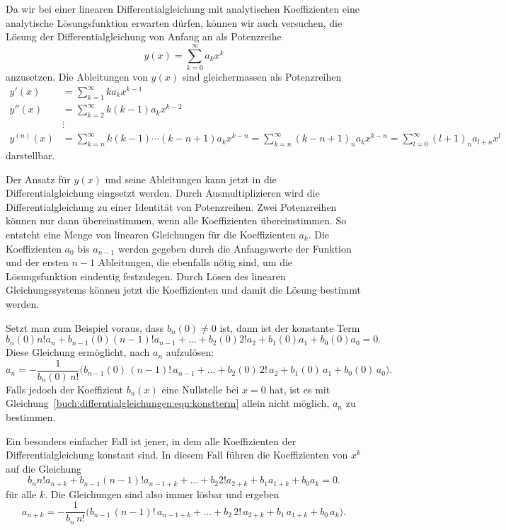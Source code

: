 Da wir bei einer linearen Differentialgleichung mit analytischen
Koeffizienten eine analytische Lösungsfunktion erwarten dürfen,
können wir auch versuchen, die Lösung der Differentialgleichung
von Anfang an als Potenzreihe
\[
y(x)
=
\sum_{k=0}^{\infty} a_kx^k
\]
anzusetzen.
Die Ableitungen von $y(x)$ sind gleichermassen als Potenzreihen
\begin{align*}
y'(x)
&=
\sum_{k=1}^\infty ka_kx^{k-1}
\\
y''(x)
&=
\sum_{k=2}^\infty k(k-1)a_kx^{k-2}
\\
&\vdots\\
y^{(n)}(x)
&=
\sum_{k=n}^\infty
k(k-1)\cdots(k-n+1) a_kx^{k-n}
=
\sum_{k=n}^\infty
(k-n+1)_n a_k x^{k-n}
=
\sum_{l=0}^\infty
(l+1)_na_{l+n}x^l
\end{align*}
darstellbar.

Der Ansatz für $y(x)$ und seine Ableitungen kann jetzt in die
Differentialgleichung eingsetzt werden.
Durch Ausmultiplizieren wird die Differentialgleichung zu
einer Identität von Potenzreihen.
Zwei Potenzreihen können nur dann übereinstimmen, wenn alle
Koeffizienten übereinstimmen.
So entsteht eine Menge von linearen Gleichungen für die
Koeffizienten $a_k$.
Die Koeffizienten $a_0$ bis $a_{n-1}$ werden gegeben durch die
Anfangswerte der Funktion und der ersten $n-1$ Ableitungen, die
ebenfalls nötig sind, um die Lösungsfunktion eindeutig festzulegen.
Durch Lösen des linearen Gleichungssystems können jetzt die Koeffizienten
und damit die Lösung bestimmt werden.

Setzt man zum Beispiel voraus, dass $b_n(0)\ne 0$ ist, dann ist der
konstante Term
\begin{equation}
b_n(0) n! a_n + b_{n-1}(0) (n-1)! a_{n-1}
+ \dots +
b_2(0) 2! a_2 + b_1(0) a_1 + b_0(0) a_0 = 0.
\label{buch:differntialgleichungen:eqn:konstterm}
\end{equation}
Diese Gleichung ermöglicht, nach $a_n$ aufzulösen:
\[
a_n
=
-
\frac{1}{b_n(0)\,n!}\bigl(
b_{n-1}(0)\,(n-1)!\,a_{n-1} + \dots + 
b_2(0)\,2!\,a_2 + b_1(0)\, a_1 + b_0(0)\, a_0
\bigr).
\]
Falls jedoch der Koeffizient $b_n(x)$ eine Nullstelle bei $x=0$
hat, ist es mit Gleichung~\eqref{buch:differntialgleichungen:eqn:konstterm}
allein nicht möglich, $a_n$ zu bestimmen.

Ein besonders einfacher Fall ist jener, in dem alle Koeffizienten der
Differentialgleichung konstant sind. 
In diesem Fall führen die Koeffizienten von $x^k$ auf die Gleichung
\begin{equation}
b_n n! a_{n+k} + b_{n-1} (n-1)! a_{n-1+k}
+ \dots +
b_2 2! a_{2+k} + b_1 a_{1+k} + b_0 a_{k} = 0.
\label{buch:differntialgleichungen:eqn:kterm}
\end{equation}
für alle $k$.
Die Gleichungen sind also immer lösbar und ergeben
\[
a_{n+k}
=
-
\frac{1}{b_n\,n!}\bigl(
b_{n-1}\,(n-1)!\,a_{n-1+k} + \dots + 
b_2\,2!\,a_{2+k} + b_1\, a_{1+k} + b_0\, a_k
\bigr).
\]



